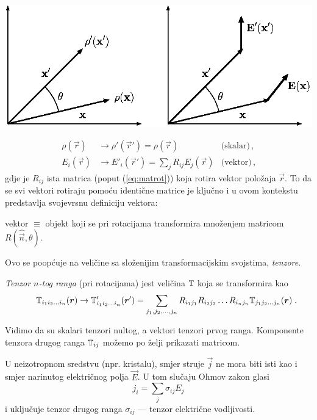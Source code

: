 \vspace*{2ex}
\centerline{\includegraphics[scale=0.8]{pics/skalarvektor.eps}}

\begin{align*}
    \rho(\vec{r}) &\to \rho'(\vec{r}') = \rho(\vec{r}) \qquad &\textrm{(skalar)} \,, \\
    E_i(\vec{r}) &\to E'_i(\vec{r}') = \sum_j R_{ij}E_j(\vec{r}) 
                 &\textrm{(vektor)} \,,
\end{align*}
gdje je $R_{ij}$ ista matrica (poput (\ref{eq:matrot})) koja rotira
vektor položaja $\vec{r}$. To da se svi vektori rotiraju pomoću identične
matrice je ključno i u ovom kontekstu predstavlja svojevrsnu definiciju
vektora:
\begin{center}
    {vektor} $\equiv$ {objekt koji se pri rotacijama transformira množenjem matricom}
    $R(\hat{\vec{n}}, \theta)$.
\end{center}
Ovo se poopćuje na veličine sa složenijim transformacijskim svojstima,
\emph{tenzore}. 
\begin{definicija}[Tenzor]
\label{def:tenzor}
\emph{Tenzor $n$-tog ranga} (pri rotacijama)  jest veličina $\mathbb{T}$  koja
se transformira kao
\begin{equation}
 \qquad \bbtensor{T}_{i_1 i_2 \ldots i_n}(\vec{r}) \to \bbtensor{T}'_{i_1 i_2 \ldots i_n}(\vec{r}') =
\sum_{j_1, j_2, \ldots, j_n}
  R_{i_1 j_1}  R_{i_2 j_2} \ldots  R_{i_n j_n} \bbtensor{T}_{j_1 j_2 \ldots j_n}(\vec{r})
 \; . 
 \label{eq:tenzor}
\end{equation}
\end{definicija}

Vidimo da su skalari tenzori nultog, a vektori tenzori prvog ranga.
Komponente tenzora drugog ranga $\mathbb{T}_{ij}$
možemo po želji prikazati matricom.

\begin{primjer}
U neizotropnom sredstvu (npr. kristalu), smjer struje $\vec{j}$ ne mora biti isti
kao i smjer narinutog električnog polja $\vec{E}$. U tom slučaju Ohmov zakon
glasi
\begin{equation*}
j_i = \sum_j \sigma_{ij} E_j
\end{equation*}
i uključuje tenzor drugog ranga $\sigma_{ij}$ --- tenzor električne vodljivosti.
\label{pr:tenzorvodljivosti}
\end{primjer}

